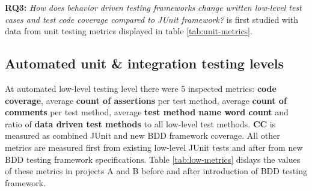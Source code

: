 {\renewcommand{\arraystretch}{1.3}
\begin{table}[H]
        \caption {Unit level testing metrics in projects and their change} \label{tab:unit-metrics}

\end{table}
}

\textbf{RQ3: }\textit{How does behavior driven testing frameworks change written low-level test cases and test code coverage compared to JUnit framework?}
is first studied with data from unit testing metrics displayed in table \ref{tab:unit-metrics}.

\clearpage
\subsection{Automated unit \& integration testing levels}
At automated low-level testing level there were 5 inspected metrics: \textbf{code coverage}, average \textbf{count of assertions} per test method,
average \textbf{count of comments} per test method, average \textbf{test method name word count} and ratio of \textbf{data driven test methods} to
all low-level test methods. \textbf{CC} is measured as combined JUnit and new BDD framework coverage. All other metrics
are measured first from existing low-level JUnit tests and after from new BDD testing framework specifications.
Table \ref{tab:low-metrics} dislays the values of these metrics in projects A and B before and after introduction of BDD testing framework.


